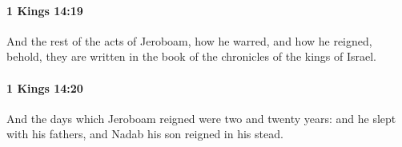 		\paragraph{1 Kings 14:19} %
			\label{1KINGS-14-19}

			And the rest of the acts of Jeroboam, how he warred, and how he reigned, behold, they are written in the book of the chronicles of the kings of Israel.


		\paragraph{1 Kings 14:20} %
			\label{1KINGS-14-20}

			And the days which Jeroboam reigned were two and twenty years: and he slept with his fathers, and Nadab his son reigned in his stead.


